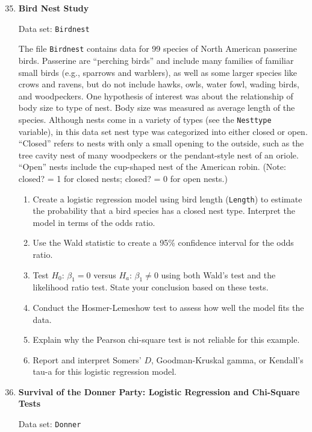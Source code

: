 \documentclass[
]{book}
\begin{document}
\begin{enumerate}
  \setcounter{enumi}{34}

  \item \textbf{Bird Nest Study}

Data set: \texttt{Birdnest}

The file \texttt{Birdnest} contains data for 99 species of North American passerine birds. Passerine are “perching birds” and include many families of familiar small birds (e.g., sparrows and warblers), as well as some larger species like crows and ravens, but do not include hawks, owls, water fowl, wading birds, and woodpeckers. One hypothesis of interest was about the relationship of body size to type of nest. Body size was measured as average length of the species. Although nests come in a variety of types (see the \texttt{Nesttype} variable), in this data set nest type was categorized into either closed or open. “Closed” refers to nests with only a small opening to the outside, such as the tree cavity nest of many woodpeckers or the pendant-style nest of an oriole. “Open” nests include the cup-shaped nest of the American robin. (Note: closed? = 1 for closed nests; closed? = 0 for open nests.)

  \begin{enumerate}
    \item Create a logistic regression model using bird length (\texttt{Length}) to estimate the probability that a bird species has a closed nest type. Interpret the model in terms of the odds ratio.
    \item Use the Wald statistic to create a 95\% confidence interval for the odds ratio.
    \item Test $H_0$: $\beta_1 = 0$ versus $H_a$: $\beta_1 \ne 0$ using both Wald’s test and the likelihood ratio test. State your conclusion based on these tests.
    \item Conduct the Hosmer-Lemeshow test to assess how well the model fits the data.
    \item Explain why the Pearson chi-square test is not reliable for this example.
    \item Report and interpret Somers’ $D$, Goodman-Kruskal gamma, or Kendall’s tau-a for this logistic regression model.
  \end{enumerate}

  \item \textbf{Survival of the Donner Party: Logistic Regression and Chi-Square Tests}

Data set: \texttt{Donner}


\end{enumerate}
\end{document}

